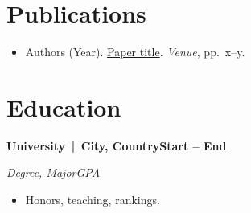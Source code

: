 \documentclass[letterpaper,11pt]{article}
\newcommand{\link}[2]{\href{#1}{\color{linkblue}#2}}
\newcommand{\entry}[2]{\textbf{#1}\hfill\textbf{#2}\par}
\newcommand{\subentry}[2]{\textit{#1}\hfill\textit{#2}\par}
\begin{document}
\section{Publications}
\begin{itemize}
  \item Authors (Year). \link{https://arxiv.org/abs/0000.00000}{Paper title}. \textit{Venue}, pp.\ x--y.
\end{itemize}

\section{Education}
\entry{University \,|\, \normalfont City, Country}{Start -- End}
\subentry{Degree, Major}{GPA}
\begin{itemize}
  \item Honors, teaching, rankings.
\end{itemize}
\end{document}
